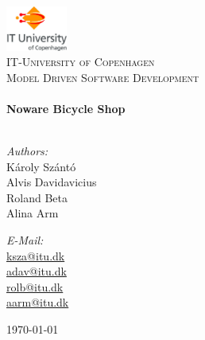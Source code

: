 
\begin{titlepage}

\begin{center}


\includegraphics[width=0.15\textwidth]{./itu_logo}\\[1cm]    

\textsc{\LARGE IT-University of Copenhagen}\\[1.5cm]

\textsc{\Large Model Driven Software Development}\\[0.5cm]

\HRule \\[0.4cm]
{ \huge \bfseries Noware Bicycle Shop}\\[0.4cm]

\HRule \\[1.5cm]

\begin{minipage}{0.4\textwidth}
\begin{flushleft} \large
\emph{Authors:}\\
K\'aroly Sz\'ant\'o\\
Alvis Davidavicius\\
Roland Beta\\
Alina Arm\\
\end{flushleft}
\end{minipage}
\begin{minipage}{0.4\textwidth}
\begin{flushright} \large
\emph{E-Mail:} \\
\href{mailto:ksza@itu.dk}{ksza@itu.dk}\\
\href{mailto:adav@itu.dk}{adav@itu.dk}\\
\href{mailto:rolb@itu.dk}{rolb@itu.dk}\\
\href{mailto:aarm@itu.dk}{aarm@itu.dk}\\
\end{flushright}
\end{minipage}

\vfill

{\large \today}

\end{center}

\end{titlepage}